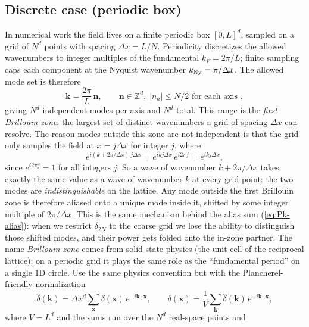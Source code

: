 \documentclass[12pt]{article}
\begin{document}
\subsection*{Discrete case (periodic box)}

In numerical work the field lives on a finite periodic box
$[0,L]^d$, sampled on a grid of $N^d$ points with spacing $\Delta
x=L/N$. Periodicity discretizes the allowed wavenumbers to integer
multiples of the fundamental $k_F=2\pi/L$; finite sampling caps each
component at the Nyquist wavenumber $k_{\rm Ny}=\pi/\Delta x$. The
allowed mode set is therefore
\begin{equation*}
\mathbf k = \frac{2\pi}{L}\,\mathbf n,
\qquad
\mathbf n\in\mathbb Z^d,\;|n_a|\le N/2 \text{ for each axis },
\end{equation*}
giving $N^d$ independent modes per axis and $N^d$ total. This range
is the \emph{first Brillouin zone}: the largest set of distinct
wavenumbers a grid of spacing $\Delta x$ can resolve. The reason
modes outside this zone are not independent is that the grid only
samples the field at $x=j\Delta x$ for integer $j$, where
\begin{equation*}
e^{i(k+2\pi/\Delta x)\,j\Delta x}
  = e^{ikj\Delta x}\,e^{i 2\pi j}
  = e^{ikj\Delta x},
\end{equation*}
since $e^{i2\pi j}=1$ for all integers $j$. So a wave of wavenumber
$k+2\pi/\Delta x$ takes exactly the same value as a wave of
wavenumber $k$ at every grid point: the two modes are
\emph{indistinguishable} on the lattice. Any mode outside the first
Brillouin zone is therefore aliased onto a unique mode inside it,
shifted by some integer multiple of $2\pi/\Delta x$. This is the
same mechanism behind the alias sum (\ref{eq:Pk-alias}): when we
restrict $\delta_{2N}$ to the coarse grid we lose the ability to
distinguish those shifted modes, and their power gets folded onto
the in-zone partner. The name \emph{Brillouin zone}
comes from solid-state physics (the unit cell of the reciprocal
lattice); on a periodic grid it plays the same role as the
``fundamental period'' on a single 1D circle. Use the same physics convention but with the
Plancherel-friendly normalization
\begin{equation}\label{eq:ft-discrete}
  \hat\delta(\mathbf k)
  = \Delta x^d\sum_{\mathbf x}\delta(\mathbf x)\,e^{-i\mathbf k\cdot\mathbf x},
  \qquad
  \delta(\mathbf x)
  = \frac{1}{V}\sum_{\mathbf k}\hat\delta(\mathbf k)\,e^{+i\mathbf k\cdot\mathbf x},
\end{equation}
where $V=L^d$ and the sums run over the $N^d$ real-space points and
\end{document}
